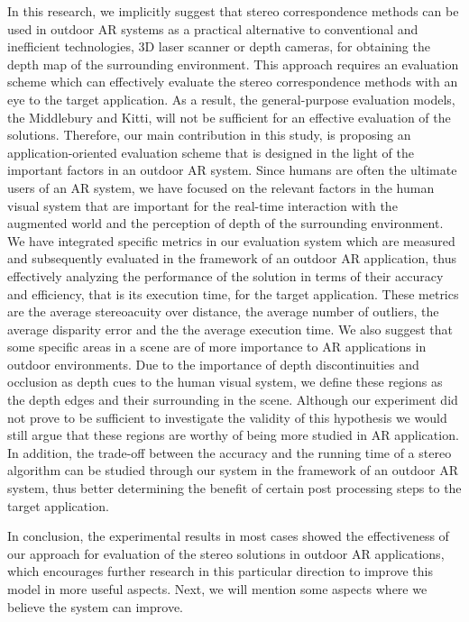 In this research, we implicitly suggest that stereo correspondence methods can be used in outdoor AR systems
as a practical alternative to conventional and inefficient technologies, 3D laser scanner or depth cameras, for obtaining the depth map of the surrounding environment.
This approach requires an evaluation scheme which can effectively evaluate the stereo correspondence methods with an eye to the target application. As a result, the general-purpose
evaluation models, the Middlebury and Kitti, will not be sufficient for an effective evaluation of the solutions.
Therefore, our main contribution in this study, is proposing an application-oriented evaluation scheme that is designed in the light of the important
factors in an outdoor AR system. Since humans are often the ultimate users of an AR system, we have focused on the relevant factors in the human visual system
that are important for the real-time interaction with the augmented world and the perception of depth of the surrounding environment. We have integrated
specific metrics in our evaluation system which are measured and subsequently evaluated in the framework of an outdoor AR application, thus effectively
analyzing the performance of the solution in terms of their accuracy and efficiency, that is its execution time, for the target application. These metrics are
the average stereoacuity over distance, the average number of outliers, the average disparity error and the the average execution time. We also suggest that some specific areas 
in a scene are of more importance to AR applications in outdoor environments. Due to the importance of depth discontinuities and occlusion as depth cues to the human visual system,
we define these regions as the depth edges and their surrounding in the scene. Although our experiment did not prove to be sufficient to investigate the validity of this hypothesis
we would still argue that these regions are worthy of being more studied in AR application.
In addition, the trade-off between the accuracy and the running time of a stereo algorithm can be studied through our system in the framework of an outdoor AR system, thus
better determining the benefit of certain post processing steps to the target application.

In conclusion, the experimental results in most cases showed the effectiveness of our approach for evaluation of the stereo solutions in outdoor AR applications, which encourages
further research in this particular direction to improve this model in more useful aspects.
Next, we will mention some aspects where we believe the system can improve.

